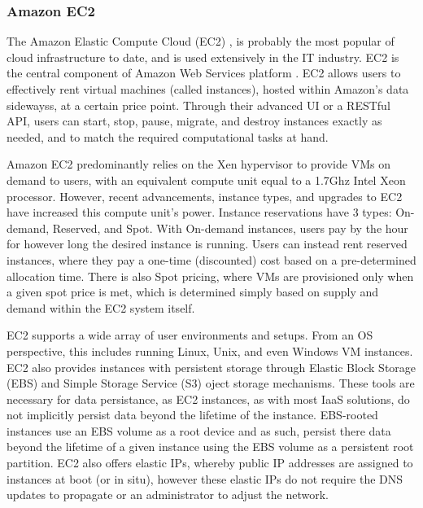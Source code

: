 
\subsubsection{Amazon EC2}


 The Amazon Elastic Compute Cloud (EC2) \cite{www-amazon-ec2}, is probably the most popular of cloud infrastructure to date, and is used extensively in the IT industry. EC2 is the central component of Amazon Web Services platform \cite{www-aws}. EC2 allows users to effectively rent virtual machines (called instances), hosted within Amazon's data sidewayss, at a certain price point. Through their advanced UI or a RESTful API, users can start, stop, pause, migrate, and destroy instances exactly as needed, and to match the required computational tasks at hand.   

Amazon EC2 predominantly relies on the Xen hypervisor to provide VMs on demand to users, with an equivalent compute unit equal to a 1.7Ghz Intel Xeon processor.  However, recent advancements, instance types, and upgrades to EC2 have increased this compute unit's power. Instance reservations have 3 types: On-demand, Reserved, and Spot. With On-demand instances, users pay by the hour for however long the desired instance is running. Users can instead rent reserved instances, where they pay a one-time (discounted) cost based on a pre-determined allocation time. There is also Spot pricing, where VMs are provisioned only when a given spot price is met, which is determined simply based on supply and demand within the EC2 system itself. 

EC2 supports a wide array of user environments and setups. From an OS perspective, this includes running Linux, Unix, and even Windows VM instances. EC2 also provides instances with persistent storage through Elastic Block Storage (EBS) and Simple Storage Service (S3) oject storage mechanisms. These tools are necessary for data persistance, as EC2 instances, as with most IaaS solutions, do not implicitly persist data beyond the lifetime of the instance. EBS-rooted instances use an EBS volume as a root device and as such, persist there data beyond the lifetime of a given instance using the EBS volume as a persistent root partition. EC2 also offers elastic IPs, whereby public IP addresses are assigned to instances at boot (or in situ), however these elastic IPs do not require the DNS updates to propagate or an administrator to adjust the network.  

